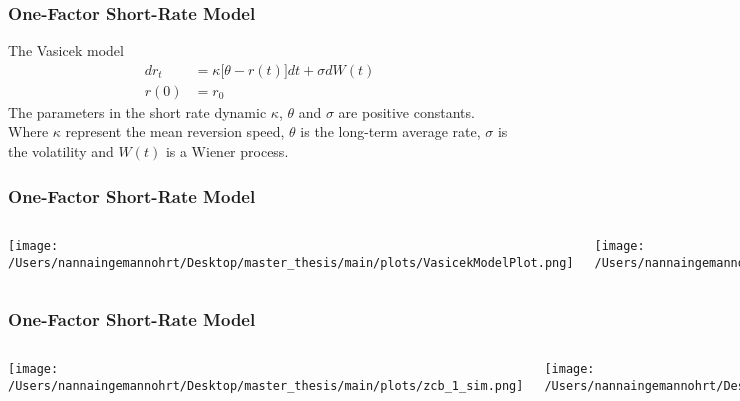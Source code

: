 \documentclass{beamer}
\begin{document}
\begin{frame}
    \frametitle{\textcolor{KUrod}{One-Factor Short-Rate Model}}
    The Vasicek model 
    \begin{align}
        d r_t &= \kappa \Big[\theta - r(t)\Big] dt + \sigma d W(t) \label{vas_dyn1}\\
        r(0) &= r_0 \label{vas_dyn_r0}
    \end{align}
    The parameters in the short rate dynamic
    $\kappa$, $\theta$ and $\sigma$ are positive constants. Where $\kappa$ represent the mean reversion speed, $\theta$ 
    is the long-term average rate, $\sigma$ is the volatility  and $W(t)$ is a Wiener process.
\end{frame}

\begin{frame}
    \frametitle{\textcolor{KUrod}{One-Factor Short-Rate Model}}

    \begin{columns}
        \begin{center}
            \texttt{[image: /Users/nannaingemannohrt/Desktop/master\_thesis/main/plots/VasicekModelPlot.png]}
            \caption{Plot of one simulated rate path  using the Vasicek model.}
        \end{center}

        \begin{center}
            \texttt{[image: /Users/nannaingemannohrt/Desktop/master\_thesis/main/plots/VasicekModelPlotSIM.png]}
            \caption{Plot of 10 simulated  rates  paths using the Vasicek model.}
        \end{center}
    \end{columns}
\end{frame}

\begin{frame}
    \frametitle{\textcolor{KUrod}{One-Factor Short-Rate Model}}

    \begin{columns}
        \begin{center}
            \texttt{[image: /Users/nannaingemannohrt/Desktop/master\_thesis/main/plots/zcb\_1\_sim.png]}
            \caption{Plot of one simulated ZCB price path using the Vasicek model.}
        \end{center}

        \begin{center}
            \texttt{[image: /Users/nannaingemannohrt/Desktop/master\_thesis/main/plots/zcb\_10\_sim.png]}
            \caption{Plot of 10 simulated  ZCB prices  paths using the Vasicek model.}
        \end{center}
    \end{columns}
\end{frame}
\end{document}

